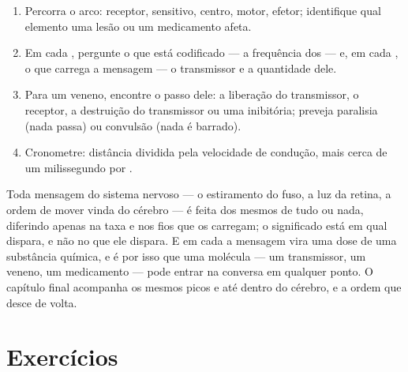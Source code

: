 \begin{method}\label{met:g12:stretch-reflex:analyse}
\begin{enumerate}
  \item Percorra o arco: receptor,  sensitivo, centro, 
        motor, efetor; identifique qual elemento uma lesão ou um
        medicamento afeta.
  \item Em cada , pergunte o que está codificado --- a
        frequência dos  --- e, em cada , o que
        carrega a mensagem --- o transmissor e a quantidade dele.
  \item Para um veneno, encontre o passo dele: a liberação do
        transmissor, o receptor, a destruição do transmissor ou uma
         inibitória; preveja paralisia (nada passa) ou convulsão
        (nada é barrado).
  \item Cronometre: distância dividida pela velocidade de condução,
        mais cerca de um milissegundo por .
\end{enumerate}
\end{method}

\begin{remark}\label{rem:g12:stretch-reflex:spikes}
Toda mensagem do sistema nervoso --- o estiramento do fuso, a luz da
retina, a ordem de mover vinda do cérebro --- é feita dos mesmos
 de tudo ou nada, diferindo apenas na taxa e nos fios
que os carregam; o significado está em qual  dispara, e não no
que ele dispara. E em cada  a mensagem vira uma dose de uma
substância química, e é por isso que uma molécula --- um transmissor,
um veneno, um medicamento --- pode entrar na conversa em qualquer
ponto. O capítulo final acompanha os mesmos picos e  até dentro
do cérebro, e a ordem que desce de volta.
\end{remark}

\section{Exercícios}

